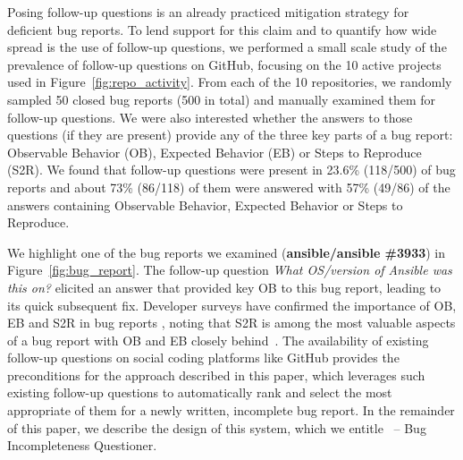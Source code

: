 Posing follow-up questions is an already practiced mitigation strategy for deficient bug
reports. To lend support for this claim and to quantify how wide spread is the use of
follow-up questions, we performed a small scale study of the prevalence
of follow-up questions on GitHub, focusing on the 10 active projects used in Figure~\ref{fig:repo_activity}.
From each of the 10 repositories, we randomly sampled 50 closed bug reports (500 in total) and manually examined them
for follow-up questions. We were also interested whether the answers to those questions (if they are present) provide any
of the three key parts of a bug report: Observable Behavior (OB), Expected Behavior (EB) or Steps to Reproduce (S2R).
We found that follow-up questions were present in 23.6\% (118/500) of bug reports and about 73\% (86/118) of them were
answered with 57\% (49/86) of the answers containing Observable Behavior, Expected Behavior or Steps to Reproduce.

We highlight one of the bug reports we examined ({\bf ansible/ansible \#3933}) in Figure~\ref{fig:bug_report}. The follow-up question {\em What OS/version of
Ansible was this on?} elicited an answer that provided key OB to this bug report, leading to its quick subsequent fix.
Developer surveys have confirmed the importance of OB, EB and S2R in bug reports , noting that S2R is among the most valuable aspects of a bug report
with OB and EB closely behind~\cite{zimmermann10whatmakes,laukkanen2011survey}. The availability of existing follow-up questions on social coding platforms like GitHub provides the preconditions for the approach described in this paper, which leverages such existing follow-up questions to automatically rank and select the most appropriate of them for a newly written, incomplete bug report. In the remainder of this paper, we describe the design of this system, which we entitle \evpi\ -- Bug Incompleteness Questioner\footnotemark{}.
